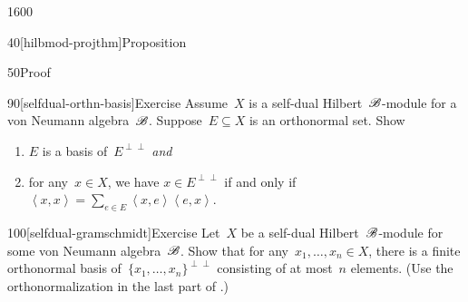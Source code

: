 \begin{parsec}{1600}
\begin{point}{40}[hilbmod-projthm]{Proposition}
\begin{point}{50}{Proof}
\end{point}
\end{point}
\begin{point}{90}[selfdual-orthn-basis]{Exercise}%
Assume~$X$ is a self-dual Hilbert~$\mathscr{B}$-module for a von Neumann
    algebra~$\mathscr{B}$.
Suppose~$E \subseteq X$ is an orthonormal set. Show
\begin{enumerate}
\item
    $E$ is a basis of~$E^{\perp\perp}$ \emph{and}
\item
    for any~$x \in X$,
        we have
    $x \in E^{\perp\perp}$
    if and only if~$\left<x,x\right> = \sum_{e \in E} \left<x,e\right>
                \left<e,x\right>$.
\end{enumerate}
\spacingfix{}
\end{point}
\begin{point}{100}[selfdual-gramschmidt]{Exercise}%
Let~$X$ be a self-dual Hilbert~$\mathscr{B}$-module for some von Neumann
    algebra~$\mathscr{B}$.
Show that for any~$x_1, \ldots, x_n \in X$,
    there is a finite orthonormal basis
    of~$\{x_1, \ldots, x_n\}^{\perp\perp}$
    consisting of at most~$n$ elements.
(Use the orthonormalization in the last part of .)
\end{point}
\end{parsec}


